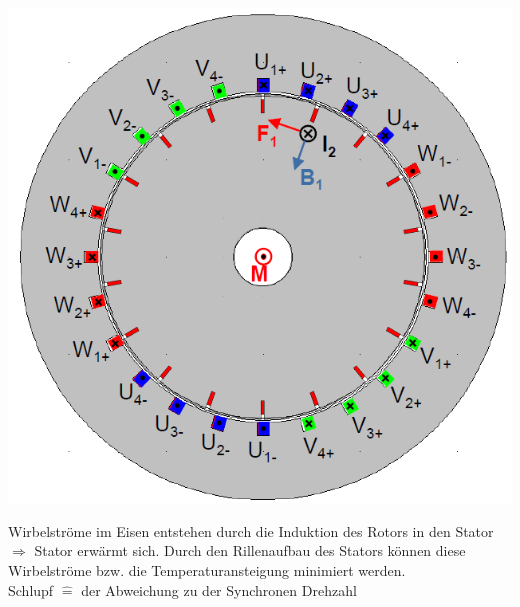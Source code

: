 \begin{multicols}{3}
        \begin{minipage}{\linewidth}
            \includegraphics[width=\linewidth]{images/QuerschnittAmotor}
        \end{minipage}
    \end{multicols}
    Wirbelströme im Eisen entstehen durch die Induktion des Rotors in den Stator \newline
    $\Rightarrow$ Stator erwärmt sich.\newline
    Durch den Rillenaufbau des Stators können diese Wirbelströme bzw. die Temperaturansteigung minimiert werden.
    \\
    Schlupf $\widehat{=}$ der Abweichung zu der Synchronen Drehzahl 
    \clearpage
    \pagebreak

